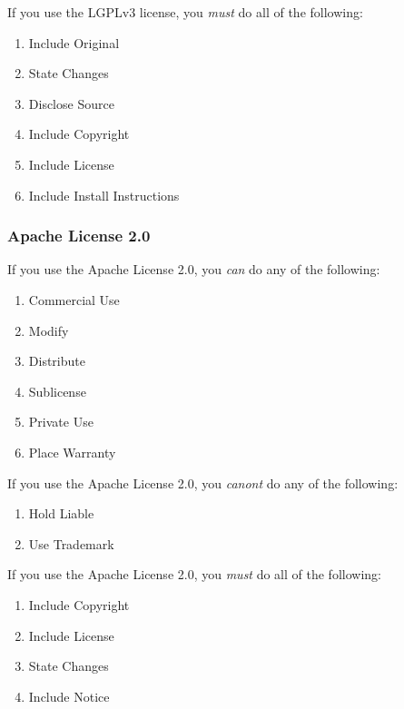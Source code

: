 \begin{flushleft}
	If you use the LGPLv3 license, you \emph{must} do all of the following:
\end{flushleft}

\begin{enumerate}
	\item Include Original
	\item State Changes
	\item Disclose Source
	\item Include Copyright
	\item Include License
	\item Include Install Instructions
\end{enumerate}


\subsubsection{Apache License 2.0}

\begin{flushleft}
	If you use the Apache License 2.0, you \emph{can} do any of the following:
\end{flushleft}

\begin{enumerate}
	\item Commercial Use
	\item Modify
	\item Distribute
	\item Sublicense
	\item Private Use
	\item Place Warranty
\end{enumerate}

\begin{flushleft}
	If you use the Apache License 2.0, you \emph{canont} do any of the following:
\end{flushleft}

\begin{enumerate}
	\item Hold Liable
	\item Use Trademark
\end{enumerate}

\begin{flushleft}
	If you use the Apache License 2.0, you \emph{must} do all of the following:
\end{flushleft}

\begin{enumerate}
	\item Include Copyright
	\item Include License
	\item State Changes
	\item Include Notice
\end{enumerate}

